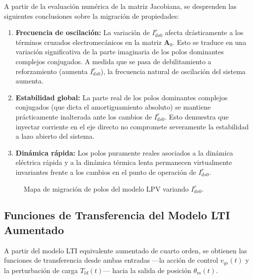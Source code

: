 \documentclass[12pt, a4paper,journal, onecolumn, compsoc]{IEEEtran}
\begin{document}
A partir de la evaluación numérica de la matriz Jacobiana, se desprenden las siguientes conclusiones sobre la migración de propiedades:
\begin{enumerate}
    \item \textbf{Frecuencia de oscilación:} La variación de $I_{ds0}^r$ afecta drásticamente a los términos cruzados electromecánicos en la matriz $\mathbf{A}_0$. Esto se traduce en una variación significativa de la parte imaginaria de los polos dominantes complejos conjugados. A medida que se pasa de debilitamiento a reforzamiento (aumenta $I_{ds0}^r$), la frecuencia natural de oscilación del sistema aumenta.
    \item \textbf{Estabilidad global:} La parte real de los polos dominantes complejos conjugados (que dicta el amortiguamiento absoluto) se mantiene prácticamente inalterada ante los cambios de $I_{ds0}^r$. Esto demuestra que inyectar corriente en el eje directo no compromete severamente la estabilidad a lazo abierto del sistema.
    \item \textbf{Dinámica rápida:} Los polos puramente reales asociados a la dinámica eléctrica rápida y a la dinámica térmica lenta permanecen virtualmente invariantes frente a los cambios en el punto de operación de $I_{ds0}^r$.
\end{enumerate}

\begin{figure}[H]
    \centering
    \caption{Mapa de migración de polos del modelo LPV variando $I_{ds0}^r$.}
    \label{fig:migracion_polos}
\end{figure}
\subsection{Funciones de Transferencia del Modelo LTI Aumentado}
A partir del modelo LTI equivalente aumentado de cuarto orden, se obtienen las funciones de transferencia desde ambas entradas ---la acción de control $v_{qs}(t)$ y la perturbación de carga $T_{ld}(t)$--- hacia la salida de posición $\theta_m(t)$.
\end{document}
